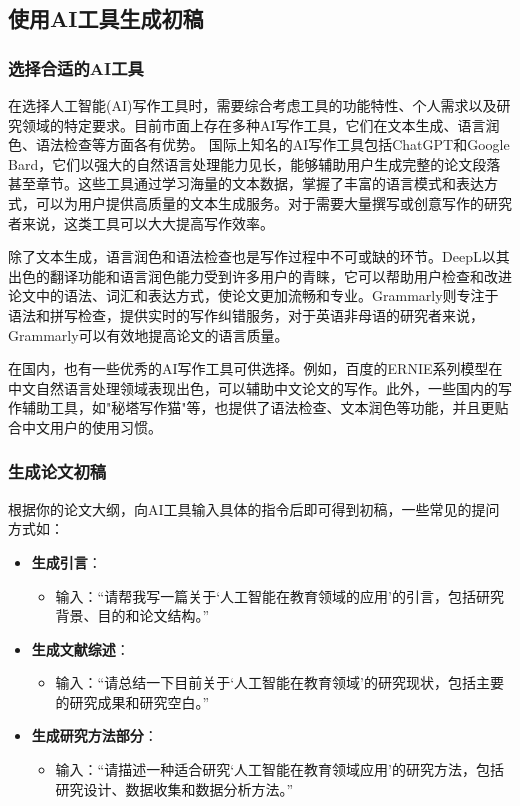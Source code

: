 \subsection{使用AI工具生成初稿}
\subsubsection{选择合适的AI工具}

在选择人工智能(AI)写作工具时，需要综合考虑工具的功能特性、个人需求以及研究领域的特定要求。目前市面上存在多种AI写作工具，它们在文本生成、语言润色、语法检查等方面各有优势。
国际上知名的AI写作工具包括ChatGPT和Google Bard，它们以强大的自然语言处理能力见长，能够辅助用户生成完整的论文段落甚至章节。这些工具通过学习海量的文本数据，掌握了丰富的语言模式和表达方式，可以为用户提供高质量的文本生成服务。对于需要大量撰写或创意写作的研究者来说，这类工具可以大大提高写作效率。

除了文本生成，语言润色和语法检查也是写作过程中不可或缺的环节。DeepL以其出色的翻译功能和语言润色能力受到许多用户的青睐，它可以帮助用户检查和改进论文中的语法、词汇和表达方式，使论文更加流畅和专业。Grammarly则专注于语法和拼写检查，提供实时的写作纠错服务，对于英语非母语的研究者来说，Grammarly可以有效地提高论文的语言质量。

在国内，也有一些优秀的AI写作工具可供选择。例如，百度的ERNIE系列模型在中文自然语言处理领域表现出色，可以辅助中文论文的写作。此外，一些国内的写作辅助工具，如"秘塔写作猫"等，也提供了语法检查、文本润色等功能，并且更贴合中文用户的使用习惯。


\subsubsection{生成论文初稿}
   根据你的论文大纲，向AI工具输入具体的指令后即可得到初稿，一些常见的提问方式如：
    \begin{itemize}
        \item \textbf{生成引言}：
        \begin{itemize}
            \item 输入：“请帮我写一篇关于‘人工智能在教育领域的应用’的引言，包括研究背景、目的和论文结构。”
        \end{itemize}
        \item \textbf{生成文献综述}：
        \begin{itemize}
            \item 输入：“请总结一下目前关于‘人工智能在教育领域’的研究现状，包括主要的研究成果和研究空白。”
        \end{itemize}
        \item \textbf{生成研究方法部分}：
        \begin{itemize}
            \item 输入：“请描述一种适合研究‘人工智能在教育领域应用’的研究方法，包括研究设计、数据收集和数据分析方法。”
        \end{itemize}
    \end{itemize}
    
